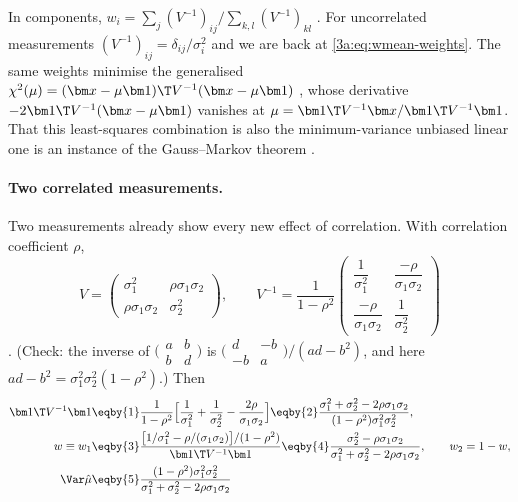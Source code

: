 In components, $w_i=\sum_j(V^{-1})_{ij}\big/\sum_{k,l}(V^{-1})_{kl}$
. For uncorrelated measurements
$(V^{-1})_{ij}=\delta_{ij}/\sigma_i^2$ and we are back at
\eqref{3a:eq:wmean-weights}. The same weights minimise the generalised
$\chi^2(\mu)=(\bm x-\mu\bm1)\T V^{-1}(\bm x-\mu\bm1)$
, whose derivative
$-2\bm1\T V^{-1}(\bm x-\mu\bm1)$ vanishes at
$\mu=\bm1\T V^{-1}\bm x/\bm1\T V^{-1}\bm1$. That this least-squares
combination is also the minimum-variance unbiased linear one is an instance
of the Gauss--Markov theorem .

\paragraph{Two correlated measurements.}
Two measurements already show every new effect of correlation. With
correlation coefficient $\rho$,
\begin{equation}
  V=\begin{pmatrix}\sigma_1^2&\rho\sigma_1\sigma_2\\ \rho\sigma_1\sigma_2&\sigma_2^2\end{pmatrix},
  \qquad
  V^{-1}=\frac{1}{1-\rho^2}
  \begin{pmatrix}\dfrac{1}{\sigma_1^2}&\dfrac{-\rho}{\sigma_1\sigma_2}\\[2mm]
  \dfrac{-\rho}{\sigma_1\sigma_2}&\dfrac{1}{\sigma_2^2}\end{pmatrix}
  \label{3a:eq:wcorr-V2}
\end{equation}
. (Check: the inverse of
$\bigl(\begin{smallmatrix}a&b\\b&d\end{smallmatrix}\bigr)$ is
$\bigl(\begin{smallmatrix}d&-b\\-b&a\end{smallmatrix}\bigr)/(ad-b^2)$, and
here $ad-b^2=\sigma_1^2\sigma_2^2(1-\rho^2)$.) Then
\begin{align}
  \bm1\T V^{-1}\bm1
  &\eqby{1}\frac{1}{1-\rho^2}\Bigl[\frac{1}{\sigma_1^2}+\frac{1}{\sigma_2^2}-\frac{2\rho}{\sigma_1\sigma_2}\Bigr]
   \eqby{2}\frac{\sigma_1^2+\sigma_2^2-2\rho\sigma_1\sigma_2}{(1-\rho^2)\sigma_1^2\sigma_2^2},
  \label{3a:eq:wcorr-info2}\\
  w\equiv w_1
  &\eqby{3}\frac{\bigl[1/\sigma_1^2-\rho/(\sigma_1\sigma_2)\bigr]/(1-\rho^2)}{\bm1\T V^{-1}\bm1}
   \eqby{4}\frac{\sigma_2^2-\rho\sigma_1\sigma_2}{\sigma_1^2+\sigma_2^2-2\rho\sigma_1\sigma_2},
  \qquad w_2=1-w,
  \label{3a:eq:wcorr-w2}\\
  \Var\hat\mu
  &\eqby{5}\frac{(1-\rho^2)\sigma_1^2\sigma_2^2}{\sigma_1^2+\sigma_2^2-2\rho\sigma_1\sigma_2}
  \label{3a:eq:wcorr-var2}
\end{align}
